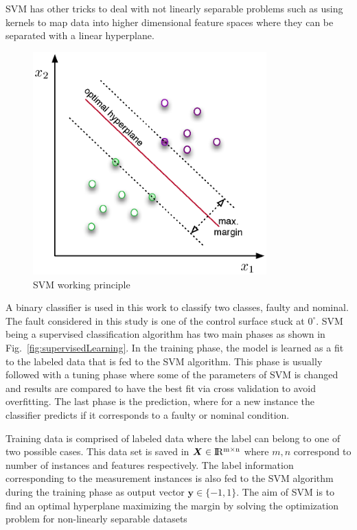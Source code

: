 SVM has other tricks to deal with not linearly separable problems such as using kernels to map data into higher dimensional feature spaces where they can be separated with a linear hyperplane.

\begin{figure}
\begin{center}
\includegraphics[width=9cm]{figures/svmHyperplane}    %
\caption{SVM working principle} 
\label{fig:svmHyperplane}
\end{center}
\end{figure}

A binary classifier is used in this work to classify two classes, faulty and nominal. The fault considered in this study is one of the control surface stuck at $0^{\circ}$. SVM being a supervised classification algorithm has two main phases as shown in Fig.~\ref{fig:supervisedLearning}. In the training phase, the model is learned as a fit to the labeled data that is fed to the SVM algorithm. This phase is usually followed with a tuning phase where some of the parameters of SVM is changed and results are compared to have the best fit via cross validation to avoid overfitting. The last phase is the prediction, where for a new instance the classifier predicts if it corresponds to a faulty or nominal condition.

Training data is comprised of labeled data where the label can belong to one of two possible cases. This data set is saved in $\bm{X} \in {\rm I\!R^{m \times n}}  $ where $m,n$ correspond to number of instances and features respectively. The label information corresponding to the measurement instances is also fed to the SVM algorithm during the training phase as output vector $\bm{y} \in \{-1,1\}$. The aim of SVM is to find an optimal hyperplane maximizing the margin by solving the optimization problem for non-linearly separable datasets

